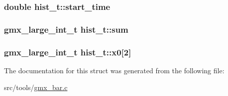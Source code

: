 \hypertarget{structhist__t_a77d840ca5af08f338c57ad5c1f2ce3ae}{
\subsubsection[{start\-\_\-time}]{\setlength{\rightskip}{0pt plus 5cm}double {\bf hist\-\_\-t\-::start\-\_\-time}}}\label{structhist__t_a77d840ca5af08f338c57ad5c1f2ce3ae}
\hypertarget{structhist__t_a1047f38f37cdedd856affb90be397364}{
\subsubsection[{sum}]{\setlength{\rightskip}{0pt plus 5cm}gmx\-\_\-large\-\_\-int\-\_\-t {\bf hist\-\_\-t\-::sum}}}\label{structhist__t_a1047f38f37cdedd856affb90be397364}
\hypertarget{structhist__t_a18c9f5177e20cf6fc8ed704a58c5c4ae}{
\subsubsection[{x0}]{\setlength{\rightskip}{0pt plus 5cm}gmx\-\_\-large\-\_\-int\-\_\-t {\bf hist\-\_\-t\-::x0}\mbox{[}2\mbox{]}}}\label{structhist__t_a18c9f5177e20cf6fc8ed704a58c5c4ae}


\-The documentation for this struct was generated from the following file\-:\begin{DoxyCompactItemize}
\item 
src/tools/\hyperlink{gmx__bar_8c}{gmx\-\_\-bar.\-c}\end{DoxyCompactItemize}
